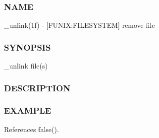 \subsubsection*{N\+A\+ME}

\+\_\+unlink(1f) -\/ \mbox{[}F\+U\+N\+IX\+:F\+I\+L\+E\+S\+Y\+S\+T\+EM\mbox{]} remove file \subsubsection*{S\+Y\+N\+O\+P\+S\+IS}

\+\_\+unlink file(s) \subsubsection*{D\+E\+S\+C\+R\+I\+P\+T\+I\+ON}

\subsubsection*{E\+X\+A\+M\+P\+LE}

References false().

